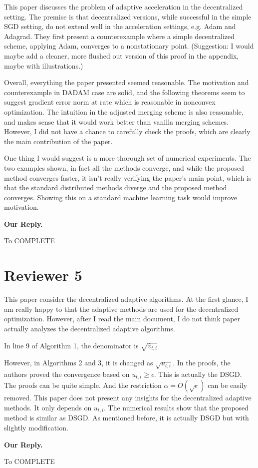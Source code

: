 \documentclass{article} %
\begin{document}
This paper discusses the problem of adaptive acceleration in the decentralized setting. The premise is that decentralized versions, while successful in the simple SGD setting, do not extend well in the acceleration settings, e.g. Adam and Adagrad. They first present a counterexample where a simple decentralized scheme, applying Adam, converges to a nonstationary point. (Suggestion: I would maybe add a cleaner, more flushed out version of this proof in the appendix, maybe with illustrations.)

Overall, everything the paper presented seemed reasonable. The motivation and counterexample in DADAM case are solid, and the following theorems seem to suggest gradient error norm  at rate  which is reasonable in nonconvex optimization. The intuition in the adjusted merging scheme is also reasonable, and makes sense that it would work better than vanilla merging schemes. However, I did not have a chance to carefully check the proofs, which are clearly the main contribution of the paper.

One thing I would suggest is a more thorough set of numerical experiments. The two examples shown, in fact all the methods converge, and while the proposed method converges faster, it isn't really verifying the paper's main point, which is that the standard distributed methods diverge and the proposed method converges. Showing this on a standard machine learning task would improve motivation.


\textbf{Our Reply.}

To COMPLETE



\section{Reviewer 5}
\vspace{-0.1in}

This paper consider the decentralized adaptive algorithms. At the first glance, I am really happy to that the adaptive methods are used for the decentralized optimization. However, after I read the main document, I do not think paper actually analyzes the decentralized adaptive algorithms.

In line 9 of Algorithm 1, the denominator is $\sqrt{\hat{v}_{t,i}}$

However, in Algorithms 2 and 3, it is changed as $\sqrt{u_{t,i}}$. In the proofs, the authors proved the convergence based on $u_{t,i}\geq \epsilon$. 
This is actually the DSGD. The proofs can be quite simple. 
And the restriction $\alpha=O(\sqrt{\epsilon})$ can be easily removed. This paper does not present any insights for the decentralized adaptive methods. It only depends on $u_{t,i}$. The numerical results show that the proposed method is similar as DSGD. As mentioned before, it is actually DSGD but with slightly modification.


\textbf{Our Reply.}

To COMPLETE
\end{document}
